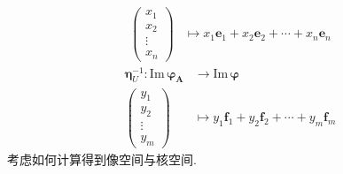 {\begin{align*}
        \begin{pmatrix}
            x_1 \\x_2\\\vdots\\x_n
        \end{pmatrix}                               & \longmapsto
        x_1\bm{e}_1+x_2\bm{e}_2+\cdots+x_n\bm{e}_n
    \end{align*}
    \begin{align*}
        \bm{\eta}_U^{-1}:\mathrm{Im}\,\bm{\varphi}_{\bm{A}} & \longrightarrow \mathrm{Im}\,\bm{\varphi} \\
        \begin{pmatrix}
            y_1 \\y_2\\\vdots\\y_m
        \end{pmatrix}                              & \longmapsto
        y_1\bm{f}_1+y_2\bm{f}_2+\cdots+y_m\bm{f}_m
    \end{align*}
}考虑如何计算得到像空间与核空间.

